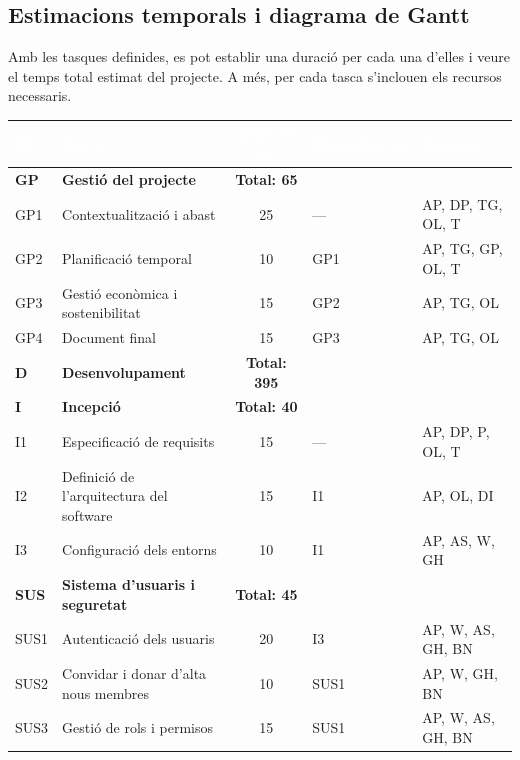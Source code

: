 \documentclass[11pt,a4paper]{report}
\begin{document}
\newpage

\subsection{Estimacions temporals i diagrama de Gantt}
Amb les tasques definides, es pot establir una duració per cada una d'elles i veure el temps total estimat del projecte. A més, per cada tasca s'inclouen els recursos necessaris.

\begin{table}[H]
    \centering
    \footnotesize
    \renewcommand{\arraystretch}{0.9}
    \begin{tabular}{|l|l|c|l|l|}
        \hline
        \rowcolor{oceanblue}
        \textcolor{white}{\textbf{ID}} & \textcolor{white}{\textbf{Tasca}} & \textcolor{white}{\textbf{Duració (h)}} & \textcolor{white}{\textbf{Dependències}} & \textcolor{white}{\textbf{Recursos}} \\
        \hline

        \rowcolor{gray!20}
        \textbf{GP} & \textbf{Gestió del projecte} & \textbf{Total: 65} & & \\
        \hline
        GP1 & Contextualització i abast & 25 & --- & AP, DP, TG, OL, T \\
        \hline
        GP2 & Planificació temporal & 10 & GP1 & AP, TG, GP, OL, T \\
        \hline
        GP3 & Gestió econòmica i sostenibilitat & 15 & GP2 & AP, TG, OL \\
        \hline
        GP4 & Document final & 15 & GP3 & AP, TG, OL \\
        \hline

        \rowcolor{gray!20}
        \textbf{D} & \textbf{Desenvolupament} & \textbf{Total: 395} & & \\
        \hline

        \rowcolor{gray!10}
        \textbf{I} & \textbf{Incepció} & \textbf{Total: 40} & & \\
        \hline
        I1 & Especificació de requisits & 15 & --- & AP, DP, P, OL, T \\
        \hline
        I2 & Definició de l'arquitectura del software & 15 & I1 & AP, OL, DI \\
        \hline
        I3 & Configuració dels entorns & 10 & I1 & AP, AS, W, GH \\
        \hline

        \rowcolor{gray!10}
        \textbf{SUS} & \textbf{Sistema d'usuaris i seguretat} & \textbf{Total: 45} & & \\
        \hline
        SUS1 & Autenticació dels usuaris & 20 & I3 & AP, W, AS, GH, BN \\
        \hline
        SUS2 & Convidar i donar d'alta nous membres & 10 & SUS1 & AP, W, GH, BN \\
        \hline
        SUS3 & Gestió de rols i permisos & 15 & SUS1 & AP, W, AS, GH, BN \\
        \hline


\end{tabular}
\end{table}
\end{document}

